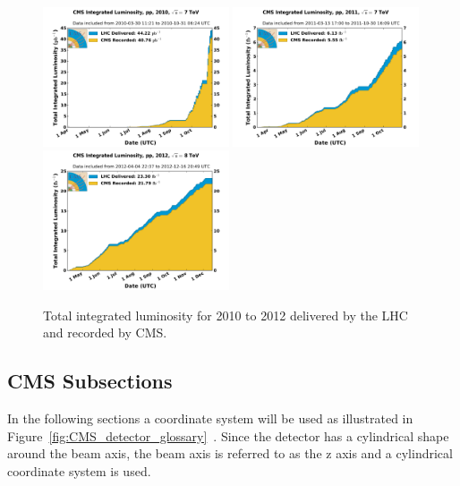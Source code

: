 \begin{figure}[htb]
\centering
\includegraphics[width=0.49\textwidth]{Experiment/int_lumi_per_day_cumulative_pp_2010.pdf}
\includegraphics[width=0.49\textwidth]{Experiment/int_lumi_per_day_cumulative_pp_2011.pdf}
\includegraphics[width=0.49\textwidth]{Experiment/int_lumi_per_day_cumulative_pp_2012.pdf}
\caption{Total integrated luminosity for 2010 to 2012 delivered by the LHC and recorded by CMS.~\cite{cms_lumi_plots}}
\label{fig:CMS_luminosity}
\end{figure}

\subsection{CMS Subsections}
In the following sections a coordinate system will be used as illustrated in Figure~\ref{fig:CMS_detector_glossary}~\cite{Pandolfi_talk}.  Since the detector has a cylindrical shape around the beam axis, the beam axis is referred to as the z axis and a cylindrical coordinate system is used.

